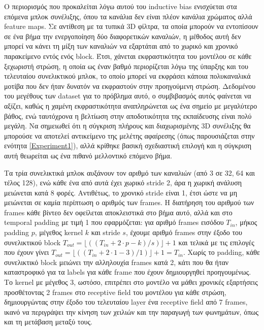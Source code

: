 Ο περιορισμός που προκαλείται λόγω αυτού του inductive bias ενισχύεται στα επόμενα μπλοκ συνέλιξης, όπου τα κανάλια δεν είναι πλέον κανάλια χρώματος αλλά feature maps. Σε αντίθεση με τα τυπικά 3D φίλτρα, τα οποία μπορούν να εντοπίσουν σε ένα βήμα την ενεργοποίηση δύο διαφορετικών καναλιών, η μέθοδος αυτή δεν μπορεί να κάνει τη μίξη των καναλιών να εξαρτάται από το χωρικό και χρονικό παρακείμενο εντός ενός block. Έτσι, χάνεται εκφραστικότητα του μοντέλου σε κάθε ξεχωριστή στρώση, η οποία ως έναν βαθμό περιορίζεται λόγω της ύπαρξης και του τελευταίου συνελικτικού μπλοκ, το οποίο μπορεί να εκφράσει κάποια πολυκαναλικά μοτίβα που δεν ήταν δυνατόν να εκφραστούν στην προηγούμενη στρώση. Δεδομένου του μεγέθους των dataset για το πρόβλημα αυτό, ο συμβιβασμός αυτός φαίνεται να αξίζει, καθώς η χαμένη εκφραστικότητα αναπληρώνεται ως ένα σημείο με μεγαλύτερο βάθος, ενώ ταυτόχρονα η βελτίωση στην αποδοτικότητα της εκπαίδευσης είναι πολύ μεγάλη. Να σημειωθεί ότι η σύγκριση πλήρους και διαχωρισμένης 3D συνέλιξης θα μπορούσε να αποτελεί αντικείμενο της μελέτης αφαίρεσης (όπως παρουσιάζεται στην ενότητα \ref{Experiment1}), αλλά κρίθηκε βασική σχεδιαστική επιλογή και η σύγκριση αυτή θεωρείται ως ένα πιθανό μελλοντικό επόμενο βήμα.

Τα τρία συνελικτικά μπλοκ αυξάνουν τον αριθμό των καναλιών (από 3 σε 32, 64 και τέλος 128), ενώ κάθε ένα από αυτά έχει χωρικό stride 2, άρα η χωρική ανάλυση μειώνεται κατά 8 φορές. Αντιθέτως, το χρονικό stride είναι 1, έτσι ώστε να μη μειώνεται σε καμία περίπτωση ο αριθμός των frames. Η διατήρηση του αριθμού των frames κάθε βίντεο δεν οφείλεται αποκλειστικά στο βήμα αυτό, αλλά και στο temporal padding με τιμή 1 που εφαρμόζεται: για αριθμό frames εισόδου $T_{in}$, μήκος padding $p$, μέγεθος kernel $k$ και stride $s$, έχουμε αριθμό frames στην έξοδο του συνελικτικού block $T_{out} = \lfloor((T_{in} + 2\cdot p - k) / s) \rfloor + 1$ και τελικά με τις επιλογές που έχουν γίνει $T_{out} = \lfloor((T_{in} + 2\cdot 1 - 3) / 1) \rfloor + 1 = Τ_{in}$. Χωρίς το padding, κάθε συνελικτικό block μειώνει την αλληλουχία frames κατά 2, κάτι που θα ήταν καταστροφικό για τα labels για κάθε frame που έχουν δημιουργηθεί προηγουμένως. Το kernel με μέγεθος 3, ωστόσο, επιτρέπει στο μοντέλο να μάθει χρονικές εξαρτήσεις προσθέτοντας 2 frames στο receptive field του μοντέλου για κάθε στρώση, δημιουργώντας στην έξοδο του τελευταίου layer ένα receptive field από 7 frames, ικανό να περιγράψει την κίνηση των χειλιών και την παραγωγή των φωνημάτων, όπως και τη μετάβαση μεταξύ τους.


